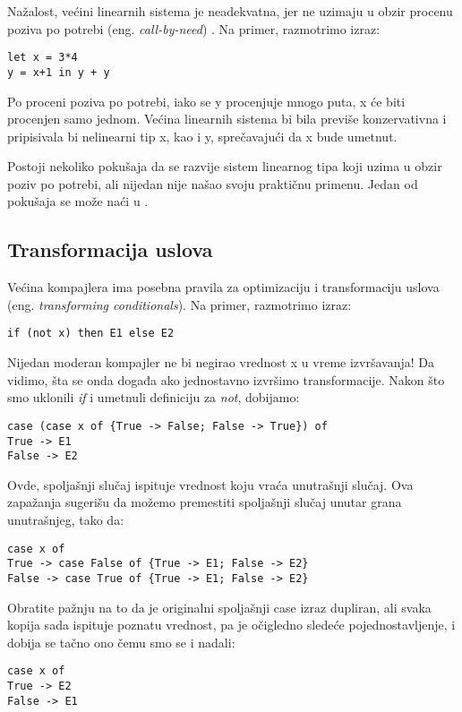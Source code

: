 Nažalost, većini linearnih sistema je neadekvatna, jer ne uzimaju u obzir procenu poziva po potrebi (eng. \emph{call-by-need}) \cite{turner}. Na primer, 
razmotrimo izraz:
\begin{verbatim}
let x = 3*4
y = x+1 in y + y
\end{verbatim}
Po proceni poziva po potrebi, iako se y procenjuje mnogo puta, x će biti procenjen samo jednom. Većina linearnih 
sistema bi bila previše konzervativna i pripisivala bi nelinearni tip x, kao i y, sprečavajući da x bude umetnut.

Postoji nekoliko pokušaja da se razvije sistem linearnog tipa koji uzima u obzir poziv po potrebi, ali nijedan nije našao svoju praktičnu primenu. Jedan od pokušaja se može naći u \cite{transformation-based-optimiser-Haskell}. 


\subsection {Transformacija uslova}
\label{sec:podnaslovTransformation}

Većina kompajlera ima posebna pravila za optimizaciju i transformaciju uslova (eng. \emph{transforming conditionals}). Na primer, razmotrimo izraz:
\begin{verbatim}
if (not x) then E1 else E2
\end{verbatim}
Nijedan moderan kompajler ne bi negirao vrednost x u vreme izvršavanja! Da vidimo, šta se onda događa ako jednostavno 
izvršimo transformacije. Nakon što smo uklonili \textit{if} i umetnuli definiciju za \textit{not}, dobijamo:
\begin{verbatim}
case (case x of {True -> False; False -> True}) of
True -> E1
False -> E2
\end{verbatim}
Ovde, spoljašnji slučaj ispituje vrednost koju vraća unutrašnji slučaj. Ova zapažanja sugerišu da možemo premestiti spoljašnji slučaj 
unutar grana unutrašnjeg, tako da:
\begin{verbatim}
case x of
True -> case False of {True -> E1; False -> E2}
False -> case True of {True -> E1; False -> E2}
\end{verbatim}

Obratite pažnju na to da je originalni spoljašnji case izraz dupliran, ali svaka kopija sada ispituje poznatu vrednost, pa je 
očigledno sledeće pojednostavljenje, i dobija se tačno ono čemu smo se i nadali:
\begin{verbatim}
case x of
True -> E2
False -> E1
\end{verbatim}

